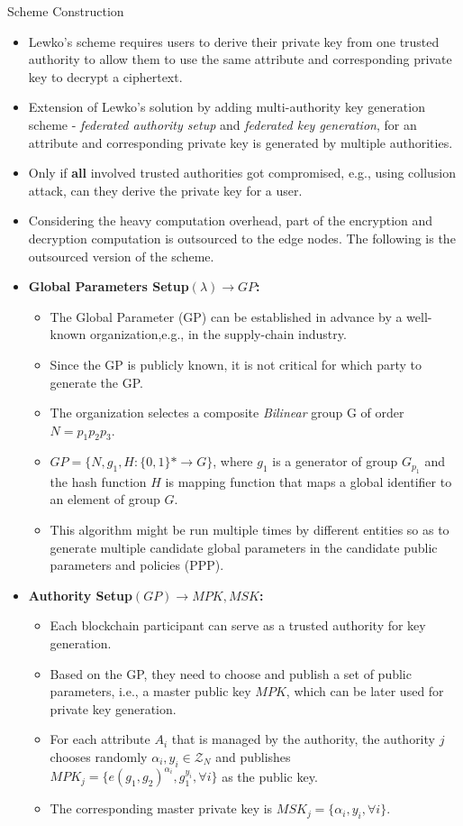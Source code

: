 \documentclass[11pt]{beamer}
\begin{document}
\begin{frame}[allowframebreaks]{Scheme Construction}
\begin{itemize}
\item Lewko's scheme requires users to derive their private key from one trusted authority to allow them to use the same attribute and corresponding private key to decrypt a ciphertext.
\item Extension of Lewko's solution by adding multi-authority key generation scheme - \textit{federated authority setup} and \textit{federated key generation}, for an attribute and corresponding private key is generated by multiple authorities.
\item Only if \textbf{all} involved trusted authorities got compromised, e.g., using collusion attack, can they derive the private key for a user.
\item Considering the heavy computation overhead, part of the encryption and decryption computation is outsourced to the edge nodes. The following is the outsourced version of the scheme.
\item \textbf{Global Parameters Setup$(\lambda)\rightarrow GP$:}
	\begin{itemize}
	\item The Global Parameter (GP) can be established in advance by a well-known organization,e.g., in the supply-chain industry.
	\item Since the GP is publicly known, it is not critical for which party to generate the GP.
	\item The organization selectes a composite \textit{Bilinear} group G of order $N=p_1p_2p_3$.
	\item $GP=\{N,g_1,H:\{0,1\}* \rightarrow G\}$, where $g_1$ is a generator of group $G_{p_1}$ and the hash function $H$ is mapping function that maps a global identifier to an element of group $G$.
	\item This algorithm might be run multiple times by different entities so as to generate multiple candidate global parameters in the candidate public parameters and policies (PPP).
	\end{itemize}
\item \textbf{Authority Setup$(GP)\rightarrow MPK,MSK$:}
	\begin{itemize}
	\item Each blockchain participant can serve as a trusted authority for key generation.
	\item Based on the GP, they need to choose and publish a set of public parameters, i.e., a master public key $MPK$, which can be later used for private key generation.
	\item For each attribute $A_i$ that is managed by the authority, the authority $j$ chooses randomly $\alpha_i,y_i \in \mathcal{Z}_N$ and publishes $MPK_j=\{e(g_1,g_2)^{\alpha_i}, g_1^{y_i},\forall i\}$ as the public key.
	\item The corresponding master private key is $MSK_j=\{\alpha_i,y_i,\forall i\}$.
	\end{itemize}
	

\end{itemize}
\end{frame}
\end{document}
